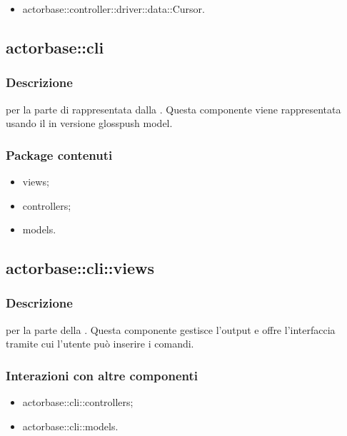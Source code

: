 \documentclass{scalatekids-article}
\begin{document}
\begin{itemize}
\item actorbase::controller::driver::data::Cursor.
\end{itemize}

\subsection{actorbase::cli}

\subsubsection{Descrizione}

 per la parte di  rappresentata dalla .
Questa componente viene rappresentata usando il 
 in versione gloss{push model}.

\subsubsection{Package contenuti}

\begin{itemize}
\item views;
\item controllers;
\item models.
\end{itemize}

\subsection{actorbase::cli::views}

\subsubsection{Descrizione}

 per la parte  della . Questa componente
gestisce l'output e offre l'interfaccia tramite cui l'utente può inserire i
comandi.

\subsubsection{Interazioni con altre componenti}

\begin{itemize}
\item actorbase::cli::controllers;
\item actorbase::cli::models.
\end{itemize}
\end{document}
